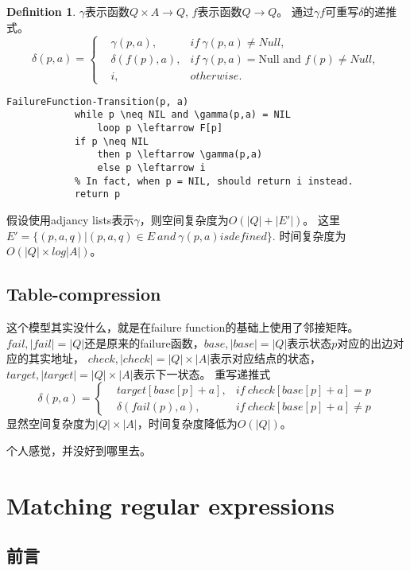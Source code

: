 \documentclass[UTF8]{ctexart}
\theoremstyle{definition}
\newtheorem{defn}[thm]{Definition}
\theoremstyle{remark}
\numberwithin{equation}{subsection}
\begin{document}
	\begin{defn}
		$\gamma$表示函数$Q \times A \rightarrow Q$, $f$表示函数$Q \rightarrow Q$。
		通过$\gamma f$可重写$\delta$的递推式。
		\[
			\delta(p,a) =
			\left\{
			\begin{aligned}
				&\gamma(p, a), 		&if\ \gamma(p, a) \neq Null,	              \\
				&\delta(f(p), a), 	&if\ \gamma(p, a) = \text{Null and } f(p) \neq Null,	\\
				&i,					&otherwise.
			\end{aligned}
			\right .
		\]
	\end{defn}
	\begin{lstlisting}[frame=shadowbox,framexleftmargin=5mm,rulesepcolor=\color{gray},numbers=none]
		FailureFunction-Transition(p, a)
			while p \neq NIL and \gamma(p,a) = NIL
				loop p \leftarrow F[p]
			if p \neq NIL
				then p \leftarrow \gamma(p,a)
				else p \leftarrow i
			% In fact, when p = NIL, should return i instead.
			return p	
	\end{lstlisting}
	假设使用adjancy lists表示$\gamma$，则空间复杂度为$O(|Q| + |E'|)$。
	这里$E' = \{(p,a,q) | (p,a,q) \in E \ and\ \gamma(p,a) is defined \}$.
	时间复杂度为$O(|Q| \times log |A|)$。
	
\subsection{Table-compression}

	这个模型其实没什么，就是在failure function的基础上使用了邻接矩阵。
	$fail, |fail|=|Q|$还是原来的failure函数，$base, |base|=|Q|$表示状态$p$对应的出边对应的其实地址，
	$check, |check|=|Q|\times|A|$表示对应结点的状态，$target, |target|=|Q|\times|A|$表示下一状态。
	重写递推式
	\[
		\delta(p, a) =
		\left\{
		\begin{aligned}
			&target[base[p]+a], 	&if\ check[base[p]+a] = p		\\
			&\delta(fail(p), a),	&if\ check[base[p]+a] \neq p
		\end{aligned}
		\right .
	\]
	显然空间复杂度为$|Q| \times |A|$，时间复杂度降低为$O(|Q|)$。
	
	个人感觉，并没好到哪里去。
	
\section{Matching regular expressions}

\subsection{前言}
\end{document}
